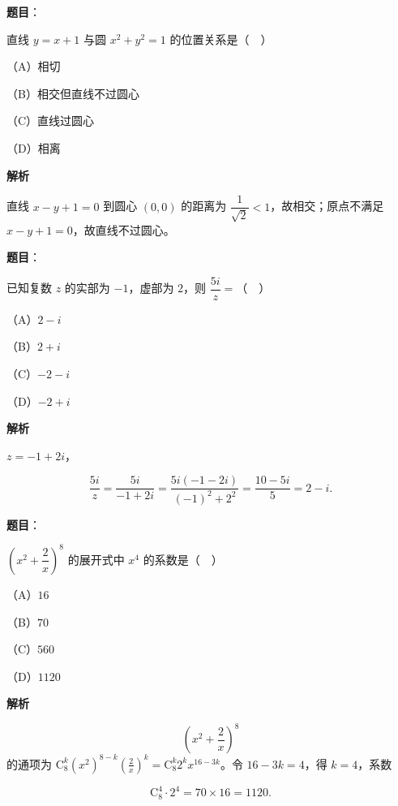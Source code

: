 \begin{answer}

\textbf{题目}：

直线 $y=x+1$ 与圆 $x^2+y^2=1$ 的位置关系是（　）

（A）相切

（B）相交但直线不过圆心

（C）直线过圆心

（D）相离

\textbf{解析}

直线 $x-y+1=0$ 到圆心 $(0,0)$ 的距离为 $\dfrac1{\sqrt2}<1$，故相交；原点不满足 $x-y+1=0$，故直线不过圆心。


\end{answer}
\begin{answer}

\textbf{题目}：

已知复数 $z$ 的实部为 $-1$，虚部为 $2$，则 $\dfrac{5i}{z}=$（　）

（A）$2-i$

（B）$2+i$

（C）$-2-i$

（D）$-2+i$

\textbf{解析}

$z=-1+2i$，

\nopagebreak[4]
\[\frac{5i}{z}=\frac{5i}{-1+2i}
=\frac{5i(-1-2i)}{(-1)^2+2^2}
=\frac{10-5i}{5}=2-i.\]


\end{answer}
\begin{answer}

\textbf{题目}：

$\left(x^2+\dfrac2x\right)^8$ 的展开式中 $x^4$ 的系数是（　）

（A）$16$

（B）$70$

（C）$560$

（D）$1120$

\textbf{解析}

\nopagebreak[4]
\[\left(x^2+\frac2x\right)^8\]
的通项为 $\mathrm C_8^k(x^2)^{8-k}\left(\frac2x\right)^k=\mathrm C_8^k2^kx^{16-3k}$。令 $16-3k=4$，得 $k=4$，系数

\nopagebreak[4]
\[\mathrm C_8^4\cdot2^4=70\times16=1120.\]


\end{answer}
